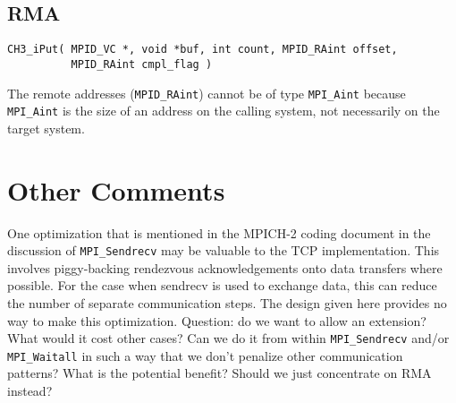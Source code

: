 \documentclass{article}
\def\code{\begingroup\makeustext\eatcode}
\def\eatcode#1{\texttt{#1}\endgroup}
\begin{document}
\subsection{RMA}
\begin{verbatim}
CH3_iPut( MPID_VC *, void *buf, int count, MPID_RAint offset, 
          MPID_RAint cmpl_flag )
\end{verbatim}
The remote addresses (\code{MPID_RAint}) cannot be of type \code{MPI_Aint}
because \code{MPI_Aint} 
is the size of an address on the calling system, not necessarily on
the target system.  

\section{Other Comments}
One optimization that is mentioned in the MPICH-2 coding document
\cite{mpich2} in the discussion of \code{MPI_Sendrecv} may be valuable
to the TCP implementation.  This involves piggy-backing rendezvous
acknowledgements onto data transfers where possible.  For the case
when sendrecv is used to exchange data, this can reduce the number of
separate communication steps.  The design given here provides no way
to make this optimization.  Question: do we want to allow an
extension?  What would it cost other cases?  Can we do it from within
\code{MPI_Sendrecv} and/or \code{MPI_Waitall} in such a way that we
don't penalize other communication patterns?  What is the potential
benefit?  Should we just concentrate on RMA instead?
\end{document}
